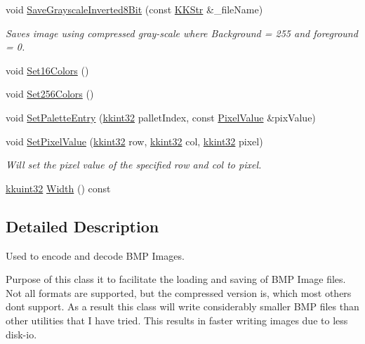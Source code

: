 \begin{DoxyCompactItemize}
$$void \hyperlink{class_k_k_b_1_1_bmp_image_ae778e224d47083032112f66f33587ba6}{Save\+Grayscale\+Inverted8\+Bit} (const \hyperlink{class_k_k_b_1_1_k_k_str}{K\+K\+Str} \&\+\_\+file\+Name)
\begin{DoxyCompactList}\small\item\em Saves image using compressed gray-\/scale where Background = 255 and foreground = 0. \end{DoxyCompactList}\item 
void \hyperlink{class_k_k_b_1_1_bmp_image_ae26fb37aebe1bd85a576330479a05742}{Set16\+Colors} ()
\item 
void \hyperlink{class_k_k_b_1_1_bmp_image_abb977b9e38c835db3971ef00092f3204}{Set256\+Colors} ()
\item 
void \hyperlink{class_k_k_b_1_1_bmp_image_abd39b778ffac08f2d64179a2897b40ff}{Set\+Palette\+Entry} (\hyperlink{namespace_k_k_b_a8fa4952cc84fda1de4bec1fbdd8d5b1b}{kkint32} pallet\+Index, const \hyperlink{class_k_k_b_1_1_pixel_value}{Pixel\+Value} \&pix\+Value)
\item 
void \hyperlink{class_k_k_b_1_1_bmp_image_aee0626356433f630910bc5d4259cd2eb}{Set\+Pixel\+Value} (\hyperlink{namespace_k_k_b_a8fa4952cc84fda1de4bec1fbdd8d5b1b}{kkint32} row, \hyperlink{namespace_k_k_b_a8fa4952cc84fda1de4bec1fbdd8d5b1b}{kkint32} col, \hyperlink{namespace_k_k_b_a8fa4952cc84fda1de4bec1fbdd8d5b1b}{kkint32} pixel)
\begin{DoxyCompactList}\small\item\em Will set the pixel value of the specified row and col to \textquotesingle{}pixel\textquotesingle{}. \end{DoxyCompactList}\item 
\hyperlink{namespace_k_k_b_af8d832f05c54994a1cce25bd5743e19a}{kkuint32} \hyperlink{class_k_k_b_1_1_bmp_image_a843e1821a1191100b03da9258e77e356}{Width} () const 
\end{DoxyCompactItemize}


\subsection{Detailed Description}
Used to encode and decode B\+MP Images. 

Purpose of this class it to facilitate the loading and saving of B\+MP Image files. Not all formats are supported, but the compressed version is, which most others don\textquotesingle{}t support. As a result this class will write considerably smaller B\+MP files than other utilities that I have tried. This results in faster writing images due to less disk-\/io.

